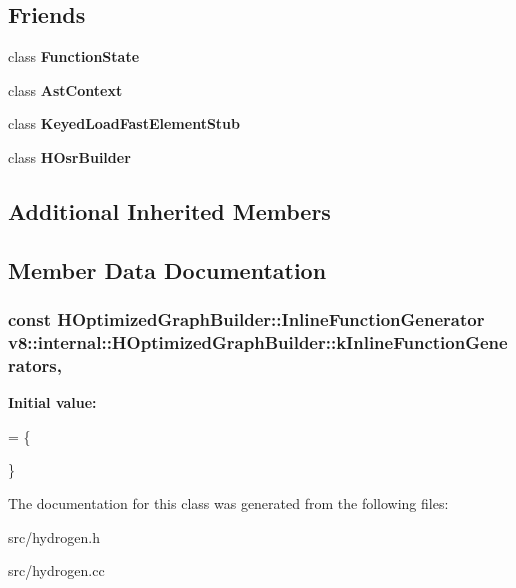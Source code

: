 \subsection*{Friends}
\begin{DoxyCompactItemize}
\item 
\hypertarget{classv8_1_1internal_1_1_h_optimized_graph_builder_a4701e71c2466ba402928d2c2f816fb4a}{}class {\bfseries Function\+State}\label{classv8_1_1internal_1_1_h_optimized_graph_builder_a4701e71c2466ba402928d2c2f816fb4a}

\item 
\hypertarget{classv8_1_1internal_1_1_h_optimized_graph_builder_a5f4a1744fc5eb14be17a570d979868c4}{}class {\bfseries Ast\+Context}\label{classv8_1_1internal_1_1_h_optimized_graph_builder_a5f4a1744fc5eb14be17a570d979868c4}

\item 
\hypertarget{classv8_1_1internal_1_1_h_optimized_graph_builder_a895ad073b7b9d0a6d169080daf136fcf}{}class {\bfseries Keyed\+Load\+Fast\+Element\+Stub}\label{classv8_1_1internal_1_1_h_optimized_graph_builder_a895ad073b7b9d0a6d169080daf136fcf}

\item 
\hypertarget{classv8_1_1internal_1_1_h_optimized_graph_builder_a8ede90e072dedf7d7e7790653b851e14}{}class {\bfseries H\+Osr\+Builder}\label{classv8_1_1internal_1_1_h_optimized_graph_builder_a8ede90e072dedf7d7e7790653b851e14}

\end{DoxyCompactItemize}
\subsection*{Additional Inherited Members}


\subsection{Member Data Documentation}
\hypertarget{classv8_1_1internal_1_1_h_optimized_graph_builder_a007069d48a6a33b62791fa4a9f364088}{}
\subsubsection[{k\+Inline\+Function\+Generators}]{\setlength{\rightskip}{0pt plus 5cm}const H\+Optimized\+Graph\+Builder\+::\+Inline\+Function\+Generator v8\+::internal\+::\+H\+Optimized\+Graph\+Builder\+::k\+Inline\+Function\+Generators\hspace{0.3cm}{\ttfamily [static]}, {\ttfamily [protected]}}\label{classv8_1_1internal_1_1_h_optimized_graph_builder_a007069d48a6a33b62791fa4a9f364088}
{\bfseries Initial value\+:}
\begin{DoxyCode}
= \{


\}
\end{DoxyCode}


The documentation for this class was generated from the following files\+:\begin{DoxyCompactItemize}
\item 
src/hydrogen.\+h\item 
src/hydrogen.\+cc\end{DoxyCompactItemize}
